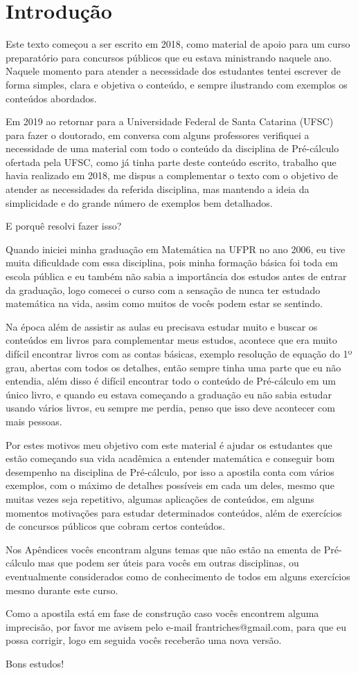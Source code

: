 \chapter{Introdução} 

Este texto começou a ser escrito em 2018, como material de apoio para um curso preparatório para concursos públicos que eu estava ministrando naquele ano. Naquele momento para atender a necessidade dos estudantes tentei escrever de forma simples, clara e objetiva o conteúdo, e sempre ilustrando com exemplos os conteúdos abordados.

Em 2019 ao retornar para a Universidade Federal de Santa Catarina (UFSC) para fazer o doutorado, em conversa com alguns professores verifiquei a necessidade de uma material com todo o conteúdo da disciplina de Pré-cálculo ofertada pela UFSC, como já tinha parte deste conteúdo escrito, trabalho que havia realizado em 2018, me dispus a complementar o texto com o objetivo de atender as necessidades da referida disciplina, mas mantendo a ideia da simplicidade e do grande número de exemplos bem detalhados. 

E porquê resolvi fazer isso?

Quando iniciei minha graduação em Matemática na UFPR no ano 2006, eu tive muita dificuldade com essa disciplina, pois minha formação básica foi toda em escola pública e eu também não sabia a importância dos estudos antes de entrar da graduação, logo comecei o curso com a sensação de nunca ter estudado matemática na vida, assim como muitos de vocês podem estar se sentindo. 

Na época além de assistir as aulas eu precisava estudar muito e buscar os conteúdos em livros para complementar meus estudos, acontece que era muito difícil encontrar livros com as contas básicas, exemplo resolução de equação do 1º grau, abertas com todos os detalhes, então sempre tinha uma parte que eu não entendia, além disso é difícil encontrar todo o conteúdo de Pré-cálculo em um único livro, e quando eu estava começando a graduação eu não sabia estudar usando vários livros, eu sempre me perdia, penso que isso deve acontecer com mais pessoas.

Por estes motivos meu objetivo com este material é ajudar os estudantes que estão começando sua vida acadêmica a entender matemática e conseguir bom desempenho na disciplina de Pré-cálculo, por isso a apostila conta com vários exemplos, com o máximo de detalhes possíveis em cada um deles, mesmo que muitas vezes seja repetitivo, algumas aplicações de conteúdos, em alguns momentos motivações para estudar determinados conteúdos, além de exercícios de concursos públicos que cobram certos conteúdos. 

Nos Apêndices vocês encontram alguns temas que não estão na ementa de Pré-cálculo mas que podem ser úteis para vocês em outras disciplinas, ou eventualmente considerados como de conhecimento de todos em alguns exercícios mesmo durante este curso.

Como a apostila está em fase de construção caso vocês encontrem alguma imprecisão, por favor me avisem pelo e-mail frantriches@gmail.com, para que eu possa corrigir, logo em seguida vocês receberão uma nova versão.

Bons estudos!